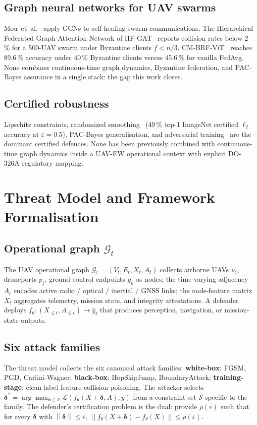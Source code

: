 \documentclass[10pt,journal,compsoc,twoside]{IEEEtran}
\newcommand{\eps}{\varepsilon}
\newcommand{\Norm}[1]{\left\|#1\right\|}
\newcommand{\calG}{\mathcal{G}}
\newcommand{\calS}{\mathcal{S}}
\newcommand{\bdelta}{\boldsymbol{\delta}}
\newcommand{\Loss}{\mathcal{L}}
\begin{document}
\subsection{Graph neural networks for UAV swarms}
Mou~et~al.~\cite{Mou2021GCN} apply GCNs to self-healing swarm
communications. The Hierarchical Federated Graph Attention Network of
HF-GAT~\cite{HFGAT2025} reports collision rates below 2\,\% for a
500-UAV swarm under Byzantine clients $f<n/3$. CM-BRF-ViT~\cite{CMBRFViT2026}
reaches 89.6\,\% accuracy under 40\,\% Byzantine clients versus
45.6\,\% for vanilla FedAvg. None combines continuous-time graph
dynamics, Byzantine federation, and PAC-Bayes assurance in a single
stack: the gap this work closes.

\subsection{Certified robustness}
Lipschitz constraints, randomized smoothing~\cite{Cohen2019Smoothing}
(49\,\% top-1 ImageNet certified $\ell_2$ accuracy at $\eps{=}0.5$),
PAC-Bayes generalisation, and adversarial training~\cite{Madry2018PGD}
are the dominant certified defences. None has been previously combined
with continuous-time graph dynamics inside a UAV-EW operational
context with explicit DO-326A regulatory mapping.

\section{Threat Model and Framework Formalisation}
\label{sec:threat}

\subsection{Operational graph $\calG_t$}
The UAV operational graph $\calG_t = (V_t, E_t, X_t, A_t)$ collects
airborne UAVs $u_i$, droneports $p_j$, ground-control endpoints $g_k$
as nodes; the time-varying adjacency $A_t$ encodes active radio /
optical / inertial / GNSS links; the node-feature matrix $X_t$
aggregates telemetry, mission state, and integrity attestations.
A defender deploys $f_\theta : (X_{\le t}, A_{\le t}) \to \hat y_t$
that produces perception, navigation, or mission-state outputs.

\subsection{Six attack families}
The threat model collects the six canonical attack families:
\textbf{white-box}: FGSM, PGD, Carlini-Wagner;
\textbf{black-box}: HopSkipJump, BoundaryAttack;
\textbf{training-stage}: clean-label feature-collision poisoning.
The attacker selects $\bdelta^* = \arg\max_{\bdelta \in \calS}
\Loss(f_\theta(X + \bdelta, A), y)$ from a constraint set $\calS$
specific to the family. The defender's certification problem is the
dual: provide $\rho(\eps)$ such that for every $\bdelta$ with
$\Norm{\bdelta} \le \eps$, $\Norm{f_\theta(X + \bdelta) - f_\theta(X)}
\le \rho(\eps)$.
\end{document}

